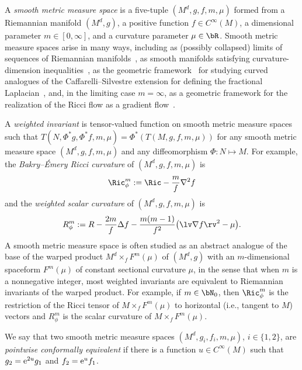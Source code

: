 A \emph{smooth metric measure space} is a five-tuple $(M^d,g,f,m,\mu)$ formed from a Riemannian manifold $(M^d,g)$, a positive function $f\in C^\infty(M)$, a dimensional parameter $m\in[0,\infty]$, and a curvature parameter $\mu\in\bR$. Smooth metric measure spaces arise in many ways, including as (possibly collapsed) limits of sequences of Riemannian manifolds~\cite{CheegerColding2000a}, as smooth manifolds satisfying curvature-dimension inequalities~\cite{BakryEmery1985,Wei_Wylie}, as the geometric framework~\cite{CaseChang2013} for studying curved analogues of the Caffarelli--Silvestre extension for defining the fractional Laplacian~\cite{CaffarelliSilvestre2007}, and, in the limiting case $m=\infty$, as a geometric framework for the realization of the Ricci flow as a gradient flow~\cite{Perelman1}.


A \emph{weighted invariant} is tensor-valued function on smooth metric measure spaces such that $T(N,\Phi^\ast g,\Phi^\ast f,m,\mu) \!=\! \Phi^\ast(T(M,g,f,m,\mu))$ for any smooth metric measure space $(M^d,g,f,m,\mu)$ and any diffeomorphism $\Phi \colon N \mapsto M$.
For example, the \emph{Bakry--\'Emery Ricci curvature} of $(M^d,g,f,m,\mu)$ is
\begin{equation*}
 \Ric_\phi^m := \Ric - \frac{m}{f}\nabla^2f
\end{equation*}
and the \emph{weighted scalar curvature} of $(M^d,g,f,m,\mu)$ is
\begin{equation*}
 R_\phi^m := R - \frac{2m}{f}\Delta f - \frac{m(m-1)}{f^2}\bigl( \lv\nabla f\rv^2 - \mu \bigr) .
\end{equation*}
A smooth metric measure space is often studied as an abstract analogue of the base of the warped product $M^d \times_f F^m(\mu)$ of $(M^d,g)$ with an $m$-dimensional spaceform $F^m(\mu)$ of constant sectional curvature $\mu$, in the sense that when $m$ is a nonnegative integer, most weighted invariants are equivalent to Riemannian invariants of the warped product.
For example, if $m \in \bN_0$, then $\Ric_\phi^m$ is the restriction of the Ricci tensor of $M \times_f F^m(\mu)$ to horizontal (i.e., tangent to $M$) vectors and $R_\phi^m$ is the scalar curvature of $M \times_f F^m(\mu)$.


We say that two smooth metric measure spaces $(M^d,g_i,f_i,m,\mu)$, $i\in\{1,2\}$, are \emph{pointwise conformally equivalent} if there is a function $u\in C^\infty(M)$ such that $g_2={\rm e}^{2u}g_1$ and $f_2={\rm e}^uf_1$.
